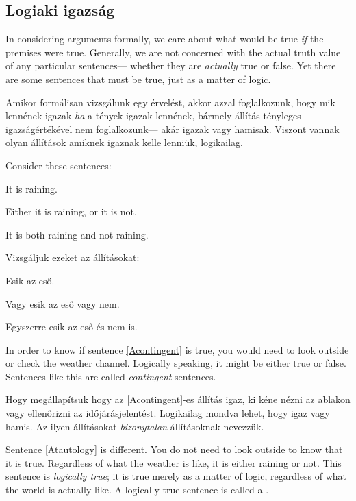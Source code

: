 \subsection{Logiaki igazság}

In considering arguments formally, we care about what would be true \emph{if} the premises were true. Generally, we are not concerned with the actual truth value of any particular sentences--- whether they are \emph{actually} true or false. Yet there are some sentences that must be true, just as a matter of logic.

Amikor formálisan vizsgálunk egy érvelést, akkor azzal foglalkozunk, hogy mik lennének igazak \emph{ha} a tények igazak lennének, bármely állítás tényleges igazságértékével nem foglalkozunk--- akár igazak vagy hamisak. Viszont vannak olyan állítások amiknek igaznak kelle lenniük, logikailag.

Consider these sentences:
\begin{earg}
\item[\ex{Acontingent}] It is raining.
\item[\ex{Atautology}] Either it is raining, or it is not.
\item[\ex{Acontradiction}] It is both raining and not raining.
\end{earg}

Vizsgáljuk ezeket az állításokat:
\begin{earg}
\item[\ex{Acontingent}] Esik az eső.
\item[\ex{Atautology}] Vagy esik az eső vagy nem.
\item[\ex{Acontradiction}] Egyszerre esik az eső és nem is.
\end{earg}

In order to know if sentence \ref{Acontingent} is true, you would need to look outside or check the weather channel. Logically speaking, it might be either true or false. Sentences like this are called \emph{contingent} sentences.

Hogy megállapítsuk hogy az \ref{Acontingent}-es állítás igaz, ki kéne nézni az ablakon vagy ellenőrizni az időjárásjelentést. Logikailag mondva lehet, hogy igaz vagy hamis. Az ilyen állításokat \emph{bizonytalan} állításoknak nevezzük.
 
Sentence \ref{Atautology} is different. You do not need to look outside to know that it is true. Regardless of what the weather is like, it is either raining or not. This sentence is \emph{logically true}; it is true merely as a matter of logic, regardless of what the world is actually like. A logically true sentence is called a .

